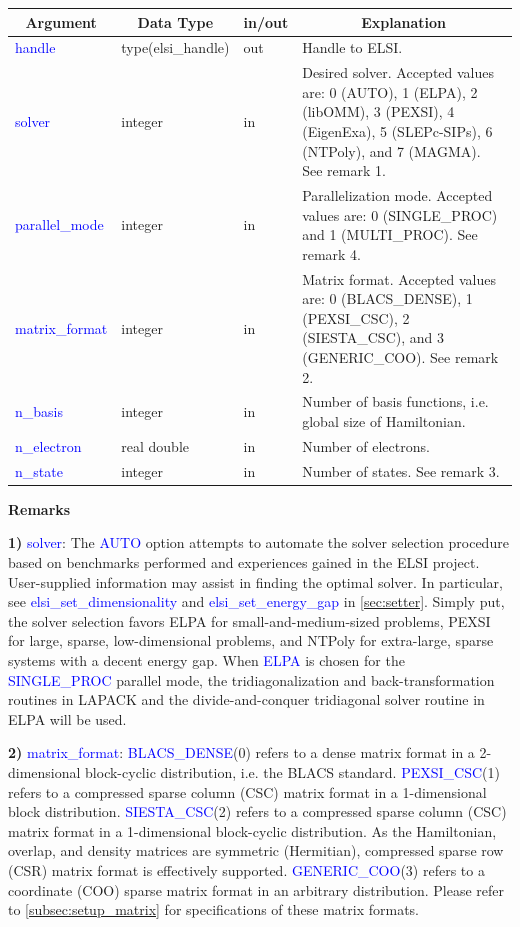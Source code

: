 \documentclass{report}
\newcommand{\tcb}[1]{\textcolor{blue}{#1}}
\begin{document}
\begin{tabular}[]{|p{30mm}|p{30mm}|p{15mm}|p{90mm}|}
\hline
\multicolumn{1}{|c|}{\textbf{Argument}} & \multicolumn{1}{c|}{\textbf{Data Type}} & \multicolumn{1}{c|}{\textbf{in/out}} & \multicolumn{1}{c|}{\textbf{Explanation}}\\
\hline
\tcb{handle}         & type(elsi\_handle) & out & Handle to ELSI.\\
\hline
\tcb{solver}         & integer            & in  & Desired solver. Accepted values are: 0 (AUTO), 1 (ELPA), 2 (libOMM), 3 (PEXSI), 4 (EigenExa), 5 (SLEPc-SIPs), 6 (NTPoly), and 7 (MAGMA). See remark 1.\\
\hline
\tcb{parallel\_mode} & integer            & in  & Parallelization mode. Accepted values are: 0 (SINGLE\_PROC) and 1 (MULTI\_PROC). See remark 4.\\
\hline
\tcb{matrix\_format} & integer            & in  & Matrix format. Accepted values are: 0 (BLACS\_DENSE), 1 (PEXSI\_CSC), 2 (SIESTA\_CSC), and 3 (GENERIC\_COO). See remark 2.\\
\hline
\tcb{n\_basis}       & integer            & in  & Number of basis functions, i.e. global size of Hamiltonian.\\
\hline
\tcb{n\_electron}    & real double        & in  & Number of electrons.\\
\hline
\tcb{n\_state}       & integer            & in  & Number of states. See remark 3.\\
\hline
\end{tabular}

\textbf{Remarks}

\textbf{1)} \tcb{solver}: The \tcb{AUTO} option attempts to automate the solver selection procedure based on benchmarks performed and experiences gained in the ELSI project. User-supplied information may assist in finding the optimal solver. In particular, see \tcb{elsi\_set\_dimensionality} and \tcb{elsi\_set\_energy\_gap} in \ref{sec:setter}. Simply put, the solver selection favors ELPA for small-and-medium-sized problems, PEXSI for large, sparse, low-dimensional problems, and NTPoly for extra-large, sparse systems with a decent energy gap. When \tcb{ELPA} is chosen for the \tcb{SINGLE\_PROC} parallel mode, the tridiagonalization and back-transformation routines in LAPACK and the divide-and-conquer tridiagonal solver routine in ELPA will be used.

\textbf{2)} \tcb{matrix\_format}: \tcb{BLACS\_DENSE}(0) refers to a dense matrix format in a 2-dimensional block-cyclic distribution, i.e. the BLACS standard. \tcb{PEXSI\_CSC}(1) refers to a compressed sparse column (CSC) matrix format in a 1-dimensional block distribution. \tcb{SIESTA\_CSC}(2) refers to a compressed sparse column (CSC) matrix format in a 1-dimensional block-cyclic distribution. As the Hamiltonian, overlap, and density matrices are symmetric (Hermitian), compressed sparse row (CSR) matrix format is effectively supported. \tcb{GENERIC\_COO}(3) refers to a coordinate (COO) sparse matrix format in an arbitrary distribution. Please refer to \ref{subsec:setup_matrix} for specifications of these matrix formats.
\end{document}
